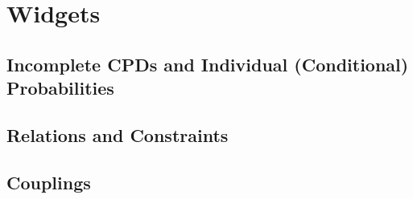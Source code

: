 
\section{Widgets}
\subsection{Incomplete CPDs and Individual (Conditional) Probabilities}
\subsection{Relations and Constraints}
\subsection{Couplings}
